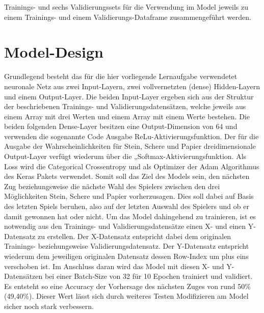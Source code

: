 \documentclass[thesis=paper,fancy]{hsmw-thesis}
\begin{document}
Trainings- und sechs Validierungssets für die Verwendung im Model jeweils zu einem Trainings- und einem Validierungs-Dataframe zusammengeführt werden.

\section{Model-Design}
Grundlegend besteht das für die hier vorliegende Lernaufgabe verwendetet neuronale Netz aus zwei Input-Layern, zwei vollvernetzten (dense) Hidden-Layern und einem Output-Layer. Die beiden Input-Layer ergeben sich aus der Struktur der beschriebenen Trainings- und Validierungsdatensätzen, welche jeweils aus einem Array mit drei Werten und einem Array mit einem Werte bestehen. Die beiden folgenden Dense-Layer besitzen eine Output-Dimension von 64 und verwenden die sogenannte 
Code	Ausgabe \glqq ReLu\grqq{}-Aktivierungsfunktion. Der für die Ausgabe der Wahrscheinlichkeiten für Stein, Schere und Papier dreidimensionale Output-Layer verfügt wiederum über die „Softmax\grqq -Aktivierungsfunktion. Als \glqq Loss\grqq{} wird die \glqq Categorical Crossentropy\grqq{} und als \glqq Optimizer\grqq{} der Adam Algorithmus des Keras Pakets verwendet. Somit soll das Ziel des Models sein, den nächsten Zug beziehungsweise die nächste Wahl des Spielers zwischen den drei Möglichkeiten Stein, Schere und Papier vorherzusagen. Dies soll dabei auf Basis des letzten Spiels beruhen, also auf der letzten Auswahl des Spielers und ob er damit gewonnen hat oder nicht. Um das Model dahingehend zu trainieren, ist es notwendig aus den Trainings- und Validierungsdatensätze einen X- und einen Y-Datensatz zu erstellen. Der X-Datensatz entspricht dabei dem originalen Trainings- beziehungsweise Validierungsdatensatz. Der Y-Datensatz entspricht wiederum dem jeweiligen originalen Datensatz dessen Row-Index um plus eins verschoben ist. Im Anschluss daran wird das Model mit diesen X- und Y-Datensätzen bei einer Batch-Size von 32 für 10 Epochen trainiert und validiert. Es entsteht so eine Accuracy der Vorhersage des nächsten Zuges von rund 50\% (49,40\%). Dieser Wert lässt sich durch weiteres Testen Modifizieren am Model sicher noch stark verbessern.
\end{document}
